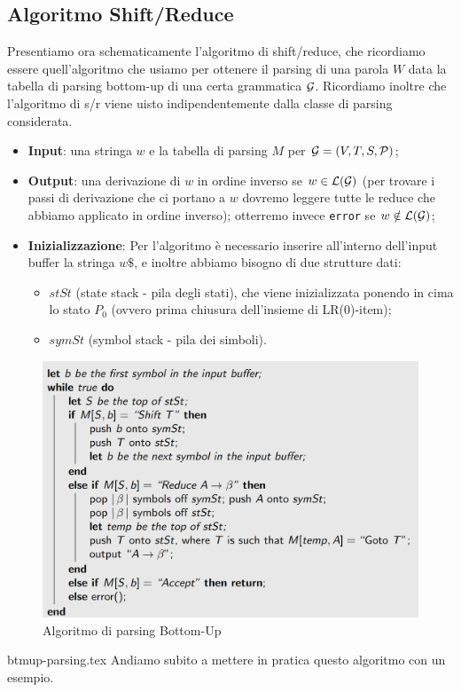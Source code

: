 \documentclass[class=book, crop=false, oneside, 12pt]{standalone}
\begin{document}
\subsection{Algoritmo Shift/Reduce}
Presentiamo ora schematicamente l'algoritmo di shift/reduce, che ricordiamo essere quell'algoritmo che usiamo per ottenere il parsing di una parola \(W\) data la tabella di parsing bottom-up di una certa grammatica \(\mathcal{G}\). Ricordiamo inoltre che l'algoritmo di s/r viene uisto indipendentemente dalla classe di parsing considerata.
\begin{itemize}
    \item \textbf{Input}: una stringa \(w\) e la tabella di parsing \(M\) per \(\mathcal{G} = (V, T, S, \mathcal{P})\);
    \item \textbf{Output}: una derivazione di \(w\) in ordine inverso se \(w \in \mathcal{L}(\mathcal{G})\) (per trovare i passi di derivazione che ci portano a \(w\) dovremo leggere tutte le reduce che abbiamo applicato in ordine inverso); otterremo invece \texttt{error} se \(w \notin \mathcal{L}(\mathcal{G})\);
    \item \textbf{Inizializzazione}: Per l'algoritmo è necessario inserire all'interno dell'input buffer la stringa \(w\$\), e inoltre abbiamo bisogno di due strutture dati:
    \begin{itemize}
        \item \(stSt\) (state stack - pila degli stati), che viene inizializzata ponendo in cima lo stato \(P_0\) (ovvero prima chiusura dell'insieme di LR(0)-item);
        \item \(symSt\) (symbol stack - pila dei simboli).
    \end{itemize}
\end{itemize}

\begin{figure}
    \centering
    \includegraphics[width=.8\textwidth]{bottom-up-parsing-algorithm.png}
    \caption{Algoritmo di parsing Bottom-Up}
    \label{fig:bottom-up-parsing-algorithm}    
\end{figure}
{btmup-parsing.tex}
Andiamo subito a mettere in pratica questo algoritmo con un esempio.
\end{document}
